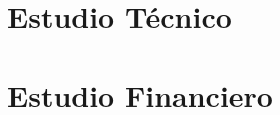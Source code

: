 \documentclass[sn-mathphys]{svmono}
\begin{document}












\chapter{Estudio Técnico}







\chapter{Estudio Financiero}







\printbibliography
\end{document}
